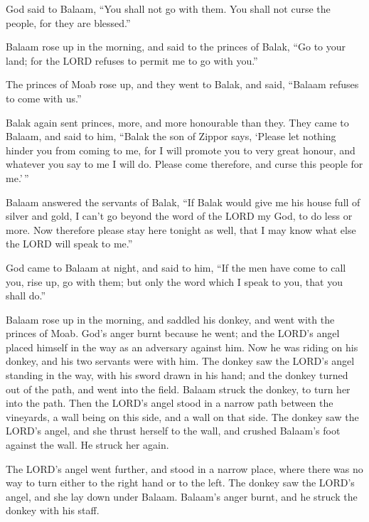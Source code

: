  God said to Balaam, ``You shall not go with them. You
shall not curse the people, for they are blessed.''

 Balaam rose up in the morning, and said to the princes
of Balak, ``Go to your land; for the LORD refuses to permit me to go
with you.''

 The princes of Moab rose up, and they went to Balak, and
said, ``Balaam refuses to come with us.''

 Balak again sent princes, more, and more honourable than
they.  They came to Balaam, and said to him, ``Balak the
son of Zippor says, `Please let nothing hinder you from coming to me,
 for I will promote you to very great honour, and
whatever you say to me I will do. Please come therefore, and curse this
people for me.'\,''

 Balaam answered the servants of Balak, ``If Balak would
give me his house full of silver and gold, I can't go beyond the word of
the LORD my God, to do less or more.  Now therefore
please stay here tonight as well, that I may know what else the LORD
will speak to me.''

 God came to Balaam at night, and said to him, ``If the
men have come to call you, rise up, go with them; but only the word
which I speak to you, that you shall do.''

 Balaam rose up in the morning, and saddled his donkey,
and went with the princes of Moab.  God's anger burnt
because he went; and the LORD's angel placed himself in the way as an
adversary against him. Now he was riding on his donkey, and his two
servants were with him.  The donkey saw the LORD's angel
standing in the way, with his sword drawn in his hand; and the donkey
turned out of the path, and went into the field. Balaam struck the
donkey, to turn her into the path.  Then the LORD's angel
stood in a narrow path between the vineyards, a wall being on this side,
and a wall on that side.  The donkey saw the LORD's
angel, and she thrust herself to the wall, and crushed Balaam's foot
against the wall. He struck her again.

 The LORD's angel went further, and stood in a narrow
place, where there was no way to turn either to the right hand or to the
left.  The donkey saw the LORD's angel, and she lay down
under Balaam. Balaam's anger burnt, and he struck the donkey with his
staff.

